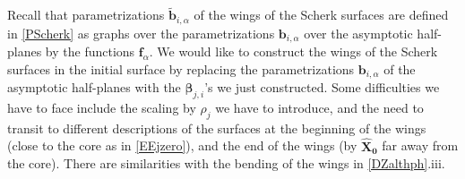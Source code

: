 \documentclass[12pt,namelimits,sumlimits]{amsart}
\theoremstyle{remark}
\numberwithin{equation}{section}
\begin{document}
Recall that parametrizations ${\widetilde{\boldsymbol{b}}}_{i,\alpha}$ of the wings of the Scherk surfaces are defined in \ref{PScherk}
as graphs over the parametrizations ${\boldsymbol{b}}_{i,\alpha}$ over the asymptotic half-planes by the functions ${\boldsymbol{f}_\alpha}$.
We would like to construct the wings of the Scherk surfaces in the initial surface by replacing the parametrizations
${\boldsymbol{b}}_{{i,\alpha}}$ of the asymptotic half-planes with the ${\boldsymbol{\beta}}_{j,i}$'s we just constructed.
Some difficulties we have to face include 
the scaling by $\rho_j$ we have to introduce,
and the need to transit to different descriptions of the surfaces
at the beginning of the wings (close to the core as in \ref{EEjzero}),
and the end of the wings (by ${\widehat{\boldsymbol{X}}}_{{\boldsymbol{0}}}$ far away from the core).
There are similarities with the bending of the wings in 
\ref{DZalthph}.iii.
\end{document}
